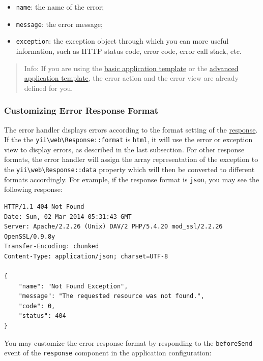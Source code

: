 \begin{itemize}
\item \lstinline|name|: the name of the error;
\item \lstinline|message|: the error message;
\item \lstinline|exception|: the exception object through which you can more useful information, such as HTTP status code,
error code, error call stack, etc.
\end{itemize}
\begin{quote}Info: If you are using the \hyperref[start-installation.md]{basic application template} or the \hyperref[tutorial-advanced-app.md]{advanced application template},
the error action and the error view are already defined for you.

\end{quote}
\subsubsection{Customizing Error Response Format \label{runtime-handling-errors.md::error-format}}
The error handler displays errors according to the format setting of the \hyperref[runtime-responses.md]{response}.
If the the \texttt{yii{\allowbreak{}\textbackslash}web{\allowbreak{}\textbackslash}Response\allowbreak{}::\allowbreak{}format} is \lstinline|html|, it will use the error or exception view
to display errors, as described in the last subsection. For other response formats, the error handler will
assign the array representation of the exception to the \texttt{yii{\allowbreak{}\textbackslash}web{\allowbreak{}\textbackslash}Response\allowbreak{}::\allowbreak{}data} property which will then
be converted to different formats accordingly. For example, if the response format is \lstinline|json|, you may see
the following response:

\begin{lstlisting}
HTTP/1.1 404 Not Found
Date: Sun, 02 Mar 2014 05:31:43 GMT
Server: Apache/2.2.26 (Unix) DAV/2 PHP/5.4.20 mod_ssl/2.2.26 OpenSSL/0.9.8y
Transfer-Encoding: chunked
Content-Type: application/json; charset=UTF-8

{
    "name": "Not Found Exception",
    "message": "The requested resource was not found.",
    "code": 0,
    "status": 404
}
\end{lstlisting}
You may customize the error response format by responding to the \lstinline|beforeSend| event of the \lstinline|response| component
in the application configuration:


